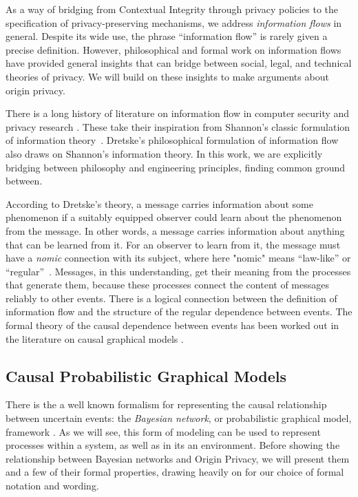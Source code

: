 \documentclass[../thesis.tex]{subfiles}
\begin{document}
As a way of bridging from Contextual Integrity through
privacy policies to the specification of privacy-preserving
mechanisms, we address \emph{information flows} in general.
Despite its wide use, the phrase ``information flow''
is rarely given a precise definition.
However, philosophical and formal work on information flows have
provided general insights that can bridge between social, legal,
and technical theories of privacy.
We will build on these insights to make
arguments about origin privacy.

There is a long history of literature on information flow
in computer security and privacy 
research \cite{mclean90sp,gray91sp,barthe04,tschantz15csf,smith15lics}.
These take their inspiration from Shannon's classic formulation 
of information theory~\cite{shannon1948mathematical}.
Dretske's philosophical
formulation of information flow~\cite{dretske1983epistemology}
also draws on Shannon's information theory.
In this work, we are explicitly bridging between philosophy and engineering
principles, finding common ground between.

According to Dretske's theory, a message
carries information about some phenomenon if a suitably equipped
observer could learn about the phenomenon from the message.
In other words, a message carries information about anything that
can be learned from it.
For an observer to learn from it, the message must have
a \emph{nomic} connection with its subject, where here "nomic" means
``law-like'' or ``regular''~\cite{dretske1981knowledge}.
Messages, in this understanding, get their meaning from the
processes that generate them, because these processes connect
the content of messages reliably to other events.
There is a logical connection between the definition of information
flow and the structure of the regular dependence between events.
The formal theory of the causal dependence between events has been
worked out in the literature on causal graphical 
models \cite{pearl1988probabilistic}.

\subsection{Causal Probabilistic Graphical Models}
\label{sec:orgheadline18}

There is the a well known formalism for representing
the causal relationship between uncertain events: the
\emph{Bayesian network}, or probabilistic 
graphical model, framework \cite{pearl1988probabilistic}. 
As we will see, this form of modeling can be used to represent
processes within a system, as well as in its an environment.
Before showing the relationship between Bayesian networks
and Origin Privacy, we will present them and a few of their
formal properties, drawing heavily on \cite{koller2003multi}
for our choice of formal notation and wording.
\end{document}
